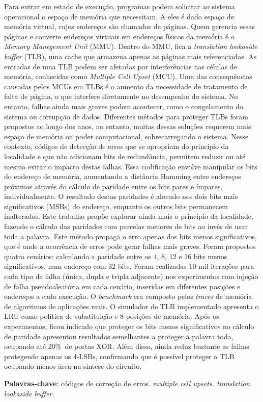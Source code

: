 \setlength{\absparsep}{18pt} %
\begin{resumo}
 Para entrar em estado de execução, programas podem solicitar ao sistema operacional o espaço de memória que necessitam. A eles é dado espaço de memória virtual, cujos endereços são chamados de páginas. Quem gerencia essas páginas e converte endereços virtuais em endereços físicos da memória é o \textit{Memory Manegement Unit} (MMU). Dentro do MMU, fica a \textit{translation lookaside buffer} (TLB), uma cache que armazena apenas as páginas mais referenciadas. As entradas de uma TLB podem ser afetadas por interferências nas células de memória, conhecidas como \textit{Multiple Cell Upset} (MCU). Uma das consequências causadas pelos MCUs em TLBs é o aumento da necessidade de tratamento de falta de página, o que interfere diretamente no desempenho do sistema. No entanto, falhas ainda mais graves podem acontecer, como o congelamento do sistema ou corrupção de dados. Diferentes métodos para proteger TLBs foram propostos ao longo dos anos, no entanto, muitas dessas soluções requerem mais espaço de memória ou poder computacional, sobrecarregando o sistema. Nesse contexto, códigos de detecção de erros que se apropriam do princípio da localidade e que não adicionam bits de redundância, permitem reduzir ou até mesmo evitar o impacto destas falhas. Essa codificação envolve manipular os bits do endereço de memória, aumentando a distância Hamming entre endereços próximos através do cálculo de paridade entre os bits pares e ímpares, individualmente. O resultado destas paridades é alocado nos dois bits mais significativos (MSBs) do endereço, enquanto os outros bits permanecem inalterados. Este trabalho propõe explorar ainda mais o princípio da localidade, fazendo o cálculo das paridades com parcelas menores de bits ao invés de usar toda a palavra. Este método propaga o erro apenas dos bits menos significativos, que é onde a ocorrência de erros pode gerar falhas mais graves. Foram propostos quatro cenários: calculando a paridade entre os 4, 8, 12 e 16 bits menos significativos, num endereço com 32 bits. Foram realizadas 10 mil iterações para cada tipo de falha (única, dupla e tripla adjacente) nos experimentos com injeção de falha pseudoaleatória em cada cenário, inseridas em diferentes posições e endereços a cada execução. O \textit{benchmark} era composto pelos \textit{traces} de memória de algoritmos de aplicações reais. O simulador de TLB implementado apresenta o LRU como política de substituição e 8 posições de memória. Após os experimentos, ficou indicado que proteger os bits menos significativos no cálculo  de paridade apresentou resultados semelhantes a proteger a palavra toda, ocupando até 20\%\ de portas XOR. Além disso, ainda reduz bastante as falhas protegendo apenas os 4-LSBs, confirmando que é possível proteger a TLB ocupando menos área na síntese do circuito. 

 \textbf{Palavras-chave}: códigos de correção de erros. \textit{multiple cell upsets. translation lookaside buffer}.
\end{resumo}
